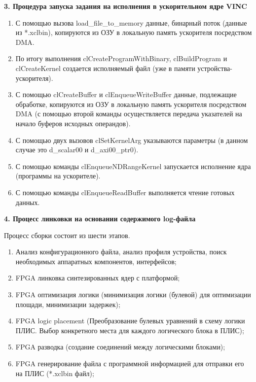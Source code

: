 \textbf{3. Процедура запуска задания на исполнения в ускорительном ядре VINC}

\begin{enumerate}
	\item С помощью вызова load\_file\_to\_memory данные, бинарный поток (данные из *.xclbin), копируются из ОЗУ в локальную память ускорителя посредством DMA.
	\item По итогу выполнения clCreateProgramWithBinary, clBuildProgram и clCreateKernel  создается исполняемый файл (уже в памяти устройства-ускорителя).
	\item С помощью clCreateBuffer и clEnqueueWriteBuffer данные, подлежащие обработке, копируются из ОЗУ в локальную память ускорителя посредством DMA (с помощью второй команды осуществляется передача указателей на начало буферов исходных операндов).
	\item С помощью двух вызовов clSetKernelArg указываются параметры (в данном случае это d\_scalar00 и d\_axi00\_ptr0).
	\item С помощью команды clEnqueueNDRangeKernel запускается исполнение ядра (программы на ускорителе).
	\item С помощью команды clEnqueueReadBuffer выполняется чтение готовых данных.
\end{enumerate}

\textbf{4. Процесс линковки на основании содержимого log-файла}

Процесс сборки состоит из шести этапов.
\begin{enumerate}
	\item Анализ конфигурационного файла, анализ профиля устройства, поиск необходимых аппаратных компонентов, интерфейсов;
	\item FPGA линковка синтезированных ядер с платформой;
	\item FPGA оптимизация логики (минимизация логики (булевой) для оптимизации площади, минимизации задержек);
	\item FPGA logic placement (Преобразование булевых уравнений в схему логики ПЛИС. Выбор конкретного места для каждого логического блока в ПЛИС);
	\item FPGA разводка (создание соединений между логическими блоками);
	\item FPGA генерирование файла с программной информацией для отправки его на ПЛИС (*.xclbin файл);
\end{enumerate}
